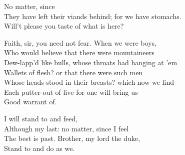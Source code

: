 \begin{verse_speech}[Sebastian] 
No matter, since\\
They have left their viands behind; for we have stomachs.\\
Will't please you taste of what is here?
\end{verse_speech}


\begin{verse_speech}[Gonzalo] 
Faith, sir, you need not fear. When we were boys,\\
Who would believe that there were mountaineers\\
Dew-lapp'd like bulls, whose throats had hanging at 'em\\
Wallets of flesh? or that there were such men\\
Whose heads stood in their breasts? which now we find\\
Each putter-out of five for one will bring us\\
Good warrant of.
\end{verse_speech}

\begin{verse_speech}[Alonso] 
I will stand to and feed,\\
Although my last: no matter, since I feel\\
The best is past. Brother, my lord the duke,\\
Stand to and do as we.
\end{verse_speech}



